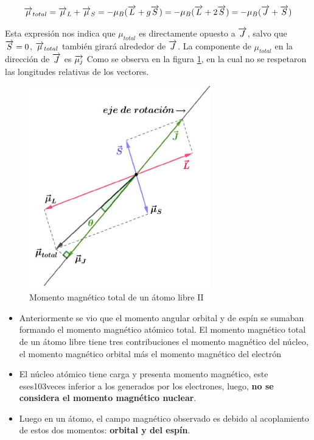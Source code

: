 \begin{sloppypar}
\begin{equation}
	\overrightarrow{\mu}_{total}=\overrightarrow{\mu}_{L}+\overrightarrow{\mu}_{S}=-\mu_{B}(\overrightarrow{L}+g\overrightarrow{S})=-\mu_{B}(\overrightarrow{L}+2\overrightarrow{S})=-\mu_{B}(\overrightarrow{J}+\overrightarrow{S})
\end{equation}

Esta expresión nos indica que $\mu_{total}$ es directamente opuesto a $\overrightarrow{J}$, salvo que ${\overrightarrow{S}=0}$, $\overrightarrow{\mu}_{total}$ también girará alrededor de $\overrightarrow{J}$. La componente de $\mu_{total}$ en la dirección de $\overrightarrow{J}$ es $\overrightarrow{\mu_{j}}$ Como se observa en la figura \ref{fig:117}, en la cual no se respetaron las longitudes relativas de los vectores.

\begin{figure}[H]
    \centering
    \includegraphics[width=0.7\textwidth]{./Figures/fig117}
	\caption{Momento magnético total de un átomo libre II}
	\label{fig:117}
 \end{figure}

\end{sloppypar}


\begin{itemize}


\item Anteriormente se vio que el momento angular orbital y de espín se sumaban formando el momento magnético atómico total. El momento magnético total de un átomo libre tiene tres contribuciones el momento magnético del núcleo, el momento magnético orbital más el momento magnético del electrón

\item El núcleo atómico tiene carga y presenta momento magnético, este eses103veces inferior a los generados por los electrones, luego, \textbf{no se considera el momento magnético nuclear}.

\item Luego en un átomo, el campo magnético observado es debido al acoplamiento de estos dos momentos: \textbf{orbital y del espín}. 
\end{itemize}

